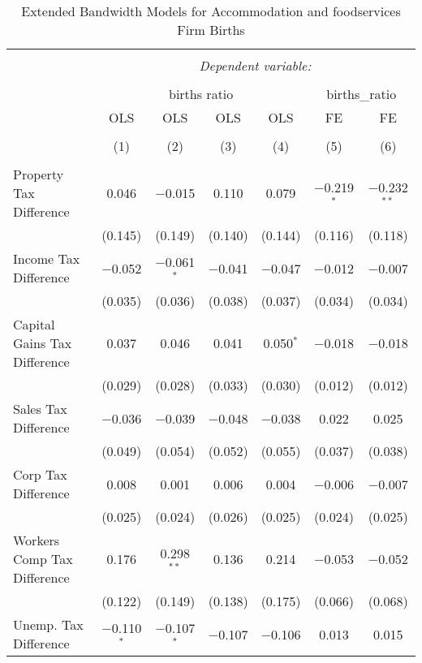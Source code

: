 
\begin{table}[!htbp] \centering 
  \caption{Extended Bandwidth Models for  Accommodation and foodservices Firm Births} 
  \label{72eb} 
\begin{tabular}{@{\extracolsep{5pt}}lcccccc} 
\\[-1.8ex]\hline 
\hline \\[-1.8ex] 
 & \multicolumn{6}{c}{\textit{Dependent variable:}} \\ 
\cline{2-7} 
\\[-1.8ex] & \multicolumn{4}{c}{births ratio} & \multicolumn{2}{c}{births\_ratio} \\ 
 & OLS & OLS & OLS & OLS & FE & FE \\ 
\\[-1.8ex] & (1) & (2) & (3) & (4) & (5) & (6)\\ 
\hline \\[-1.8ex] 
 Property Tax Difference & 0.046 & $-$0.015 & 0.110 & 0.079 & $-$0.219$^{*}$ & $-$0.232$^{**}$ \\ 
  & (0.145) & (0.149) & (0.140) & (0.144) & (0.116) & (0.118) \\ 
  Income Tax Difference & $-$0.052 & $-$0.061$^{*}$ & $-$0.041 & $-$0.047 & $-$0.012 & $-$0.007 \\ 
  & (0.035) & (0.036) & (0.038) & (0.037) & (0.034) & (0.034) \\ 
  Capital Gains Tax Difference & 0.037 & 0.046 & 0.041 & 0.050$^{*}$ & $-$0.018 & $-$0.018 \\ 
  & (0.029) & (0.028) & (0.033) & (0.030) & (0.012) & (0.012) \\ 
  Sales Tax Difference & $-$0.036 & $-$0.039 & $-$0.048 & $-$0.038 & 0.022 & 0.025 \\ 
  & (0.049) & (0.054) & (0.052) & (0.055) & (0.037) & (0.038) \\ 
  Corp Tax Difference & 0.008 & 0.001 & 0.006 & 0.004 & $-$0.006 & $-$0.007 \\ 
  & (0.025) & (0.024) & (0.026) & (0.025) & (0.024) & (0.025) \\ 
  Workers Comp Tax Difference & 0.176 & 0.298$^{**}$ & 0.136 & 0.214 & $-$0.053 & $-$0.052 \\ 
  & (0.122) & (0.149) & (0.138) & (0.175) & (0.066) & (0.068) \\ 
  Unemp. Tax Difference & $-$0.110$^{*}$ & $-$0.107$^{*}$ & $-$0.107 & $-$0.106 & 0.013 & 0.015 \\ 

\end{tabular}
\end{table}
